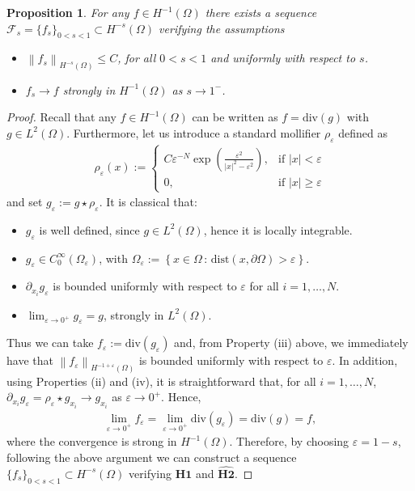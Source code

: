 \documentclass[reqno,twoside]{amsart}
\newtheorem{proposition}[theorem]{Proposition}
\numberwithin{equation}{section}
\newcommand{\norm}[2]{{\left\|#1\right\|}_{#2}}
\begin{document}
\begin{proposition}\label{limit_f}
	For any $f\in H^{-1}(\Omega)$ there exists a sequence $\mathcal{F}_s=\{f_s\}_{0<s<1}\subset H^{-s}(\Omega)$ verifying the assumptions
	\begin{itemize}
		\item[$\textbf{H1}$] $\norm{f_s}{H^{-s}(\Omega)}\leq C$, for all $0<s<1$ and uniformly with respect to $s$.
		
		\item[$\widehat{\textbf{H2}}$] $f_s\to f$ strongly in $H^{-1}(\Omega)$ as $s\to 1^-$.
	\end{itemize}		
\end{proposition}

\begin{proof}
Recall that any $f\in H^{-1}(\Omega)$ can be written as $f=\textrm{div}(g)$ with $g\in L^2(\Omega)$. Furthermore, let us introduce a standard mollifier $\rho_\varepsilon$ defined as 
\begin{align*}
	\rho_\varepsilon(x):= \begin{cases}
	C\varepsilon^{-N}\exp\left(\frac{\varepsilon^2}{|x|^2-\varepsilon^2}\right), & \textrm{if } |x|<\varepsilon
	\\
	0, & \textrm{if } |x|\geq\varepsilon
	\end{cases}
\end{align*}
and set $g_\varepsilon:=g\star\rho_\varepsilon$. It is classical that:
\begin{itemize}
		\item[(i)] $g_\varepsilon$ is well defined, since $g\in L^2(\Omega)$, hence it is locally integrable.
		\item[(ii)] $g_\varepsilon\in C_0^\infty(\Omega_\varepsilon)$, with $\Omega_\varepsilon:=\left\{x\in\Omega\,:\, \textrm{dist}(x,\partial\Omega)>\varepsilon\right\}.$
		\item[(iii)] $\partial_{x_i}g_\varepsilon$ is bounded uniformly with respect to $\varepsilon$ for all $i=1,\ldots,N$.
		\item[(iv)] $\lim_{\varepsilon\to 0^+} g_\varepsilon = g$, strongly in $L^2(\Omega)$. 
\end{itemize}
	
Thus we can take $f_\varepsilon:=\textrm{div}(g_\varepsilon)$ and, from Property (iii) above, we immediately have that $\norm{f_\varepsilon}{H^{-1+\varepsilon}(\Omega)}$ is bounded uniformly with respect to $\varepsilon$. In addition, using Properties (ii) and (iv), it is straightforward that, for all $i=1,\ldots,N$, $\partial_{x_i} g_\varepsilon = \rho_\varepsilon\star g_{x_i} \to g_{x_i}$ as $\varepsilon\to 0^+$. Hence, 
\begin{align*}
	\lim_{\varepsilon\to 0^+}f_\varepsilon = \lim_{\varepsilon\to 0^+}\textrm{div}(g_\varepsilon) = \textrm{div}(g) = f,
\end{align*}
where the convergence is strong in $H^{-1}(\Omega)$. Therefore, by choosing $\varepsilon=1-s$, following the above argument we can construct a sequence $\{f_s\}_{0<s<1}\subset H^{-s}(\Omega)$ verifying $\textbf{H1}$ and $\widehat{\textbf{H2}}$.
\end{proof}
\end{document}
